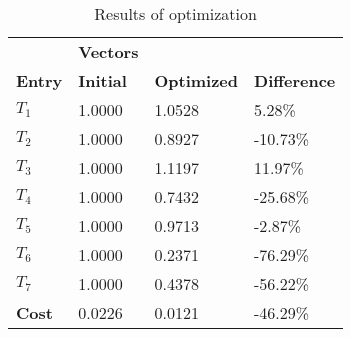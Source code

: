 \begin{table}[H]
\centering
\begin{tabular}{llll}
\textbf{}      & \cellcolor[HTML]{EFEFEF}\textbf{Vectors} & \textbf{} & \textbf{}         \\
\rowcolor[HTML]{EFEFEF} 
\textbf{Entry} & \textbf{Initial} & \textbf{Optimized} & \textbf{Difference} \\
$T_1$ & 1.0000 & 1.0528 & 5.28\% \\ 
$T_2$ & 1.0000 & 0.8927 & -10.73\% \\ 
$T_3$ & 1.0000 & 1.1197 & 11.97\% \\ 
$T_4$ & 1.0000 & 0.7432 & -25.68\% \\ 
$T_5$ & 1.0000 & 0.9713 & -2.87\% \\ 
$T_6$ & 1.0000 & 0.2371 & -76.29\% \\ 
$T_7$ & 1.0000 & 0.4378 & -56.22\% \\ 
\rowcolor[HTML]{EFEFEF} 
\textbf{Cost}  & 0.0226 & 0.0121 & -46.29\% \\ 
\end{tabular}
\caption{Results of optimization}
\label{tab:OptimizationAnalysis}
\end{table}